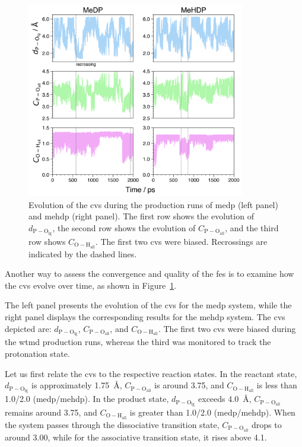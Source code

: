 \begin{figure}[b!]
    \centering
    \includegraphics[width=0.85\textwidth]{Figures/4_Results/results_300K_cv_evolution.png}
    \caption{Evolution of the \acp{cv} during the production runs of \ac{medp} (left panel) and \ac{mehdp} (right panel). The first row shows the evolution of $d_\mathrm{P-O_{\mathrm{lg}}}$, the second row shows the evolution of $C_\mathrm{P-O_{\mathrm{all}}}$, and the third row shows $C_\mathrm{O-H_{\mathrm{all}}}$. The first two \acp{cv} were biased. Recrossings are indicated by the dashed lines.}
    \label{fig:300k_cv_evolution}
\end{figure}

Another way to assess the convergence and quality of the \ac{fes} is to examine how the \acp{cv} evolve over time, as shown in Figure~\ref{fig:300k_cv_evolution}.

The left panel presents the evolution of the \acp{cv} for the \ac{medp} system, while the right panel displays the corresponding results for the \ac{mehdp} system. The \acp{cv} depicted are: $d_\mathrm{P-O_{\mathrm{lg}}}$, $C_\mathrm{P-O_{\mathrm{all}}}$, and $C_\mathrm{O-H_{\mathrm{all}}}$. The first two \acp{cv} were biased during the \ac{wtmd} production runs, whereas the third was monitored to track the protonation state.

Let us first relate the \acp{cv} to the respective reaction states. In the reactant state, $d_\mathrm{P-O_{\mathrm{lg}}}$ is approximately 1.75~\AA, $C_\mathrm{P-O_{\mathrm{all}}}$ is around 3.75, and $C_\mathrm{O-H_{\mathrm{all}}}$ is less than 1.0/2.0 (\ac{medp}/\ac{mehdp}). In the product state, $d_\mathrm{P-O_{\mathrm{lg}}}$ exceeds 4.0~\AA, $C_\mathrm{P-O_{\mathrm{all}}}$ remains around 3.75, and $C_\mathrm{O-H_{\mathrm{all}}}$ is greater than 1.0/2.0 (\ac{medp}/\ac{mehdp}). When the system passes through the dissociative transition state, $C_\mathrm{P-O_{\mathrm{all}}}$ drops to around 3.00, while for the associative transition state, it rises above 4.1.

